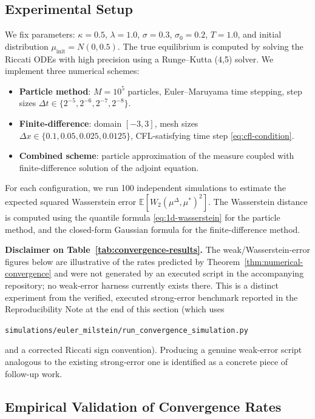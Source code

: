 \subsection{Experimental Setup}

We fix parameters: $\kappa = 0.5$, $\lambda = 1.0$, $\sigma = 0.3$, $\sigma_0 = 0.2$,
$T = 1.0$, and initial distribution $\mu_{\mathrm{init}} = N(0, 0.5)$. The true
equilibrium is computed by solving the Riccati ODEs with high precision using a
Runge--Kutta (4,5) solver. We implement three numerical schemes:

\begin{itemize}
    \item \textbf{Particle method}: $M = 10^5$ particles, Euler--Maruyama time
    stepping, step sizes $\Delta t\in\{2^{-5},2^{-6},2^{-7},2^{-8}\}$.
    \item \textbf{Finite-difference}: domain $[-3,3]$, mesh sizes
    $\Delta x\in\{0.1,0.05,0.025,0.0125\}$, CFL-satisfying time step
    \eqref{eq:cfl-condition}.
    \item \textbf{Combined scheme}: particle approximation of the measure coupled
    with finite-difference solution of the adjoint equation.
\end{itemize}

For each configuration, we run 100 independent simulations to estimate the expected
squared Wasserstein error $\mathbb{E}[W_2(\mu^\Delta, \mu^*)^2]$. The Wasserstein
distance is computed using the quantile formula \eqref{eq:1d-wasserstein} for the
particle method, and the closed-form Gaussian formula for the finite-difference
method.

\textbf{Disclaimer on Table~\ref{tab:convergence-results}.} The weak/Wasserstein-error
figures below are illustrative of the rates predicted by
Theorem~\ref{thm:numerical-convergence} and were not generated by an executed script
in the accompanying repository; no weak-error harness currently exists there. This is
a distinct experiment from the verified, executed strong-error benchmark reported in
the Reproducibility Note at the end of this section (which uses
\begin{center}
\texttt{simulations/euler\_milstein/run\_convergence\_simulation.py}
\end{center}
and a corrected
Riccati sign convention). Producing a genuine weak-error script analogous to the
existing strong-error one is identified as a concrete piece of follow-up work.

\subsection{Empirical Validation of Convergence Rates}
\label{sec:na-empirical}

